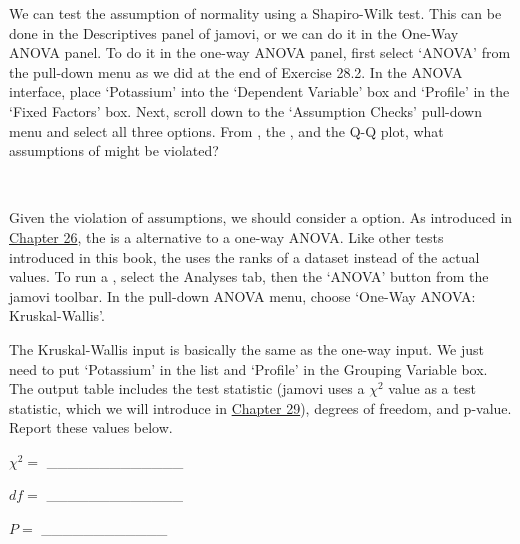 \documentclass[
  openany]{krantz}
\begin{document}
\begin{verbatim}

\end{verbatim}

We can test the assumption of normality using a Shapiro-Wilk test.
This can be done in the Descriptives panel of jamovi, or we can do it in the One-Way ANOVA panel.
To do it in the one-way ANOVA panel, first select `ANOVA' from the pull-down menu as we did at the end of Exercise 28.2.
In the ANOVA interface, place `Potassium' into the `Dependent Variable' box and `Profile' in the `Fixed Factors' box.
Next, scroll down to the `Assumption Checks' pull-down menu and select all three options.
From , the , and the Q-Q plot, what assumptions of  might be violated?

\begin{verbatim}


\end{verbatim}

Given the violation of  assumptions, we should consider a  option.
As introduced in \protect\hyperlink{Chapter_26}{Chapter 26}, the  is a  alternative to a one-way ANOVA.
Like other  tests introduced in this book, the  uses the ranks of a dataset instead of the actual values.
To run a , select the Analyses tab, then the `ANOVA' button from the jamovi toolbar.
In the pull-down ANOVA menu, choose `One-Way ANOVA: Kruskal-Wallis'.

The Kruskal-Wallis input is basically the same as the one-way  input.
We just need to put `Potassium' in the  list and `Profile' in the Grouping Variable box.
The output table includes the test statistic (jamovi uses a \(\chi^{2}\) value as a test statistic, which we will introduce in \protect\hyperlink{Chapter_29}{Chapter 29}), degrees of freedom, and p-value.
Report these values below.

\(\chi^{2} =\) \_\_\_\_\_\_\_\_\_\_\_\_\_

\(df =\) \_\_\_\_\_\_\_\_\_\_\_\_\_

\(P =\) \_\_\_\_\_\_\_\_\_\_\_\_
\end{document}
